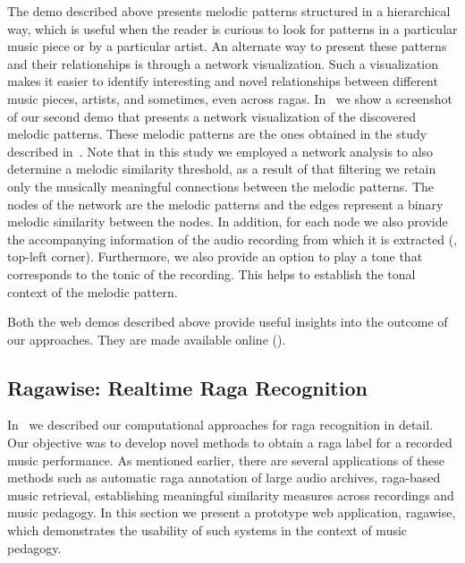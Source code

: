 The demo described above presents melodic patterns structured in a hierarchical way, which is useful when the reader is curious to look for patterns in a particular music piece or by a particular artist. An alternate way to present these patterns and their relationships is through a network visualization. Such a visualization makes it easier to identify interesting and novel relationships between different music pieces, artists, and sometimes, even across \glspl{raga}. In~ we show a screenshot of our second demo that presents a network visualization of the discovered melodic patterns. These melodic patterns are the ones obtained in the study described in~\secref{}. Note that in this study we employed a network analysis to also determine a melodic similarity threshold, as a result of that filtering we retain only the musically meaningful connections between the melodic patterns. The nodes of the network are the melodic patterns and the edges represent a binary melodic similarity between the nodes.  In addition, for each node we also provide the accompanying information of the audio recording from which it is extracted (, top-left corner). Furthermore, we also provide an option to play a tone that corresponds to the tonic of the recording. This helps to establish the tonal context of the melodic pattern.

Both the web demos described above provide useful insights into the outcome of our approaches. They are made available online (). 


\subsection*{Ragawise: Realtime Raga Recognition}
\label{sec:ragawise}

In~\chapref{} we described our computational approaches for \gls{raga} recognition in detail. Our objective was to develop novel methods to obtain a \gls{raga} label for a recorded music performance. As mentioned earlier, there are several applications of these methods such as automatic \gls{raga} annotation of large audio archives, \gls{raga}-based music retrieval, establishing meaningful similarity measures across recordings and music pedagogy. In this section we present a prototype web application, \gls{ragawise}, which demonstrates the usability of such systems in the context of music pedagogy. 

